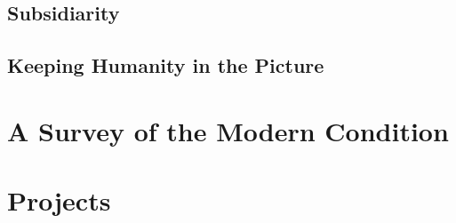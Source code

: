 \documentclass[10pt,letterpaper,openany]{book}
\begin{document}
\subsection{Subsidiarity}

\subsection{Keeping Humanity in the Picture}

\section{A Survey of the Modern Condition}

\section{Projects}
\end{document}
